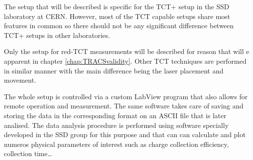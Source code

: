The setup that will be described is specific for the TCT+ setup in the SSD laboratory at CERN. However, most of the TCT capable setups share most features in common so there should not be any significant difference between TCT+ setups in other laboratories. 

Only the setup for red-TCT measurements will be described for reason that will e apparent in chapter \ref{chap:TRACSvalidity}. Other TCT techniques are performed in similar manner with the main difference being the laser placement and movement.



The whole setup is controlled via a custom LabView\cite{labview} program that also allows for remote operation and measurement. The same software takes care of saving and storing the data in the corresponding format on an ASCII file that is later analised. The data analysis procedure is performed using software specially developed in the SSD group for this purpose and that can can calculate and plot numeros physical parameters of interest such as charge collection efficiency, collection time\ldots






 
